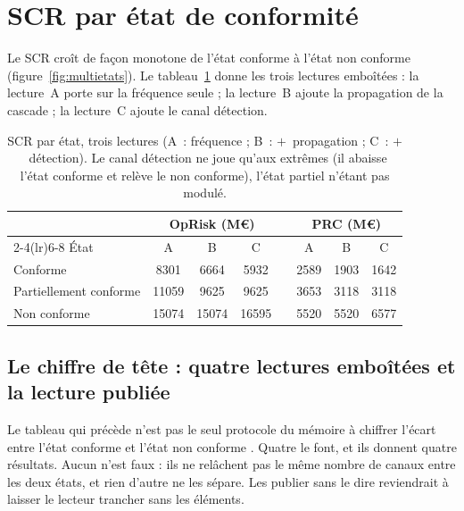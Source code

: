 
\section{SCR par état de conformité}

Le SCR croît de façon monotone de l'état conforme à l'état non conforme
(figure~\ref{fig:multietats}). Le tableau~\ref{tab:scretat} donne les trois lectures emboîtées :
la lecture~A porte sur la fréquence seule ; la lecture~B ajoute la
propagation de la cascade ; la lecture~C ajoute le canal détection.

\begin{table}[htbp]\centering\small
\renewcommand{\arraystretch}{1.25}
\begin{tabular}{@{}l ccc c ccc@{}}
\toprule
& \multicolumn{3}{c}{\textbf{OpRisk} (M\euro)} & & \multicolumn{3}{c}{\textbf{PRC} (M\euro)} \\
\cmidrule(lr){2-4}\cmidrule(lr){6-8}
État & A & B & C & & A & B & C \\
\midrule
Conforme               & 8301  & 6664  & 5932  & & 2589 & 1903 & 1642 \\
Partiellement conforme & 11059 & 9625  & 9625  & & 3653 & 3118 & 3118 \\
Non conforme           & 15074 & 15074 & 16595 & & 5520 & 5520 & 6577 \\
\bottomrule
\end{tabular}
\caption{SCR par état, trois lectures (A~: fréquence ; B~: $+$~propagation ; C~:
$+$~détection). Le canal détection ne joue qu'aux extrêmes (il
abaisse l'état conforme et relève le non conforme), l'état partiel n'étant pas modulé.}
\label{tab:scretat}
\end{table}

\subsection*{Le chiffre de tête : quatre lectures emboîtées et la lecture publiée}
\label{sec:chiffre-de-tete}

Le tableau qui précède n'est pas le seul protocole du mémoire à chiffrer \og l'écart entre l'état
conforme et l'état non conforme \fg{}. Quatre le font, et ils donnent quatre résultats. Aucun
n'est faux : ils ne relâchent pas le même nombre de canaux entre les deux états, et rien
d'autre ne les sépare. Les publier sans le dire reviendrait à laisser le lecteur trancher sans les éléments.

